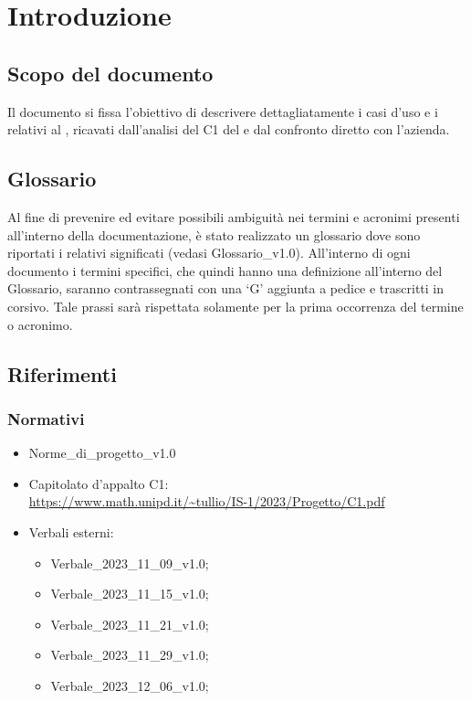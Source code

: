 \chapter{Introduzione} \label{cap:intro}
\section{Scopo del documento}
Il documento si fissa l'obiettivo di descrivere dettagliatamente i casi d’uso e i  relativi al   , ricavati dall’analisi del  C1 del   e dal confronto diretto con l'azienda.
\section{Glossario}
Al fine di prevenire ed evitare possibili ambiguità nei termini e acronimi presenti all’interno della documentazione, è stato realizzato un glossario dove sono riportati i relativi significati (vedasi Glossario\_v1.0). All’interno di ogni documento i termini specifici, che quindi hanno una definizione all’interno del Glossario, saranno contrassegnati con una ‘G’ aggiunta a pedice e trascritti in corsivo. Tale prassi sarà rispettata solamente per la prima occorrenza del termine o acronimo.
\section{Riferimenti}
\subsection{Normativi}
\begin{itemize}
    \item Norme\_di\_progetto\_v1.0
    \item Capitolato d'appalto C1: \\ \url{https://www.math.unipd.it/~tullio/IS-1/2023/Progetto/C1.pdf}
    \item Verbali esterni:
        \begin{itemize}
            \item Verbale\_2023\_11\_09\_v1.0;
            \item Verbale\_2023\_11\_15\_v1.0;
            \item Verbale\_2023\_11\_21\_v1.0;
            \item Verbale\_2023\_11\_29\_v1.0;
            \item Verbale\_2023\_12\_06\_v1.0;
        \end{itemize}
\end{itemize}


